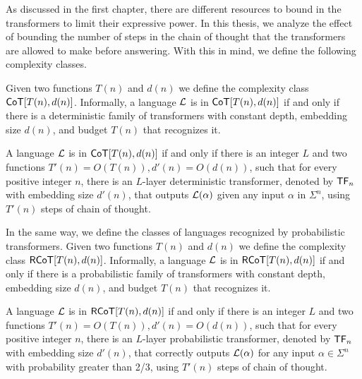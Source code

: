 As discussed in the first chapter, there are different resources to bound in the transformers to limit their expressive power.
In this thesis, we analyze the effect of bounding the number of steps in the chain of thought that the transformers are allowed to make before answering.
With this in mind, we define the following complexity classes.


\medskip

Given two functions $T(n)$ and $d(n)$ we define the complexity class $\mathsf{CoT}[T(n), d(n)]$.
Informally, a language $\mathcal{L}$ is in $\mathsf{CoT}[T(n), d(n)]$ if and only if there is a deterministic family of transformers with constant depth, embedding size $d(n)$, and budget $T(n)$ that recognizes it.

\begin{definition}[$\CoTtndn$]
    A language $\mathcal{L}$ is in $\mathsf{CoT}[T(n), d(n)]$ if and only if there is an integer $L$ and two functions $T'(n) = O(T(n)), d'(n) = O(d(n))$, such that for every positive integer $n$, there is an $L$-layer deterministic transformer, denoted by $\mathsf{TF}_n$ with embedding size $d'(n)$, that outputs $\mathcal{L}(\alpha)$ given any input $\alpha$ in $\Sigma^n$, using $T'(n)$ steps of chain of thought.
\end{definition}


\smallskip

In the same way, we define the classes of languages recognized by probabilistic transformers.
Given two functions $T(n)$ and $d(n)$ we define the complexity class $\mathsf{RCoT}[T(n), d(n)]$.
Informally, a language $\mathcal{L}$ is in $\mathsf{RCoT}[T(n), d(n)]$ if and only if there is a probabilistic family of transformers with constant depth, embedding size $d(n)$, and budget $T(n)$ that recognizes it.

\begin{definition}[$\RCoTtndn$]
    A language $\mathcal{L}$ is in $\mathsf{RCoT}[T(n), d(n)]$ if and only if there is an integer $L$ and two functions $T'(n) = O(T(n)), d'(n) = O(d(n))$, such that for every positive integer $n$, there is an $L$-layer probabilistic transformer, denoted by $\mathsf{TF}_n$ with embedding size $d'(n)$, that correctly outputs $\mathcal{L}(\alpha)$ for any input $\alpha \in \Sigma^n$ with probability greater than 2/3, using $T'(n)$ steps of chain of thought.
\end{definition}



